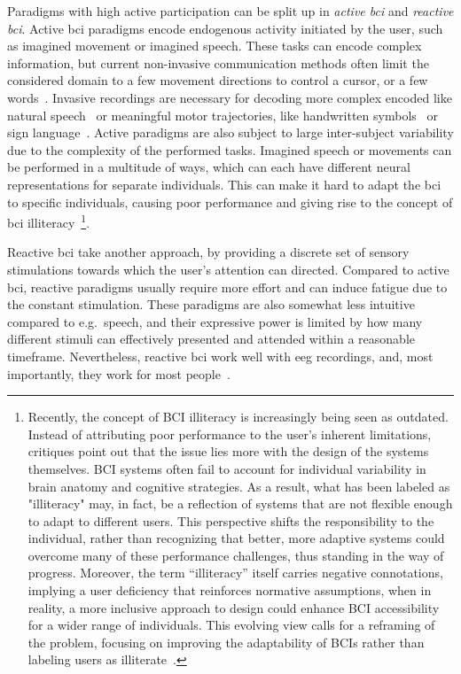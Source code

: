 Paradigms with high active participation can be split up in \emph{active
\ac{bci}} and \emph{reactive \ac{bci}}.
Active \ac{bci} paradigms encode endogenous activity initiated by the user,
such as imagined movement or imagined speech.
These tasks can encode complex information, but current non-invasive
communication methods often limit the considered domain to a few movement
directions to control a cursor, or a few words~\cite{Panachakel2021}.
Invasive recordings are necessary for decoding more complex encoded
like natural speech~\cite{Metzger2023} or meaningful motor trajectories, like handwritten
symbols~\cite{Willett2021} or sign language~\cite{Branco2017}.
Active paradigms are also subject to large inter-subject variability due to the
complexity of the performed tasks.
Imagined speech or movements can be performed in a multitude of ways, which
can each have different neural representations for separate individuals.
This can make it hard to adapt the \ac{bci} to specific individuals, causing
poor performance and giving rise to the concept of \ac{bci}
illiteracy~\cite{Allison2010}\footnote{%
Recently, the concept of BCI illiteracy is increasingly being seen as outdated.
Instead of attributing poor performance to the user's inherent limitations,
critiques point out that the issue lies more with the design of the
systems themselves. BCI systems often fail to account for individual
variability in brain anatomy and cognitive strategies. As a result, what has
been labeled as "illiteracy" may, in fact, be a reflection of systems that are
not flexible enough to adapt to different users. This perspective
shifts the responsibility to the individual, rather than recognizing that
better, more adaptive systems could overcome many of these performance
challenges, thus standing in the way of progress.
Moreover, the term ``illiteracy'' itself carries negative
connotations, implying a user deficiency that reinforces normative assumptions,
when in reality, a more inclusive approach to design could enhance BCI
accessibility for a wider range of individuals. This evolving view calls for a
reframing of the problem, focusing on improving the adaptability of BCIs rather
than labeling users as illiterate~\cite{Becker2022,Thompson2019}.
}.

Reactive \ac{bci} take another approach, by providing a discrete set of
sensory stimulations towards which the user's attention can directed.
Compared to active \ac{bci}, reactive paradigms usually require more effort
and can induce fatigue due to the constant stimulation.
These paradigms are also somewhat less intuitive compared to e.g.\ speech, and
their expressive power is limited by how many different stimuli can effectively
presented and attended within a reasonable timeframe.
Nevertheless, reactive \ac{bci} work well with \ac{eeg} recordings, and, most
importantly, they work for most people~\cite{Allison2010a,Edlinger2014}.

